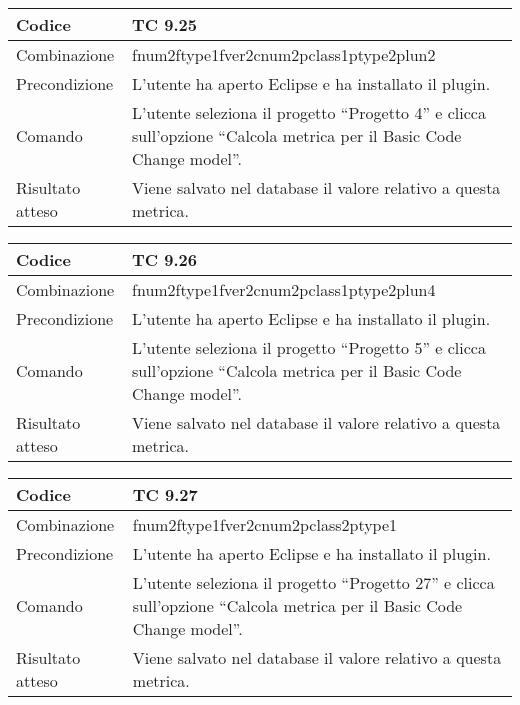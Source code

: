 \begin{table}[ht]
\begin{tabular}{|p{3cm}|p{9cm}|}
\hline
\cellcolor{lightgray}Codice				& TC 9.25								\\
\hline
\cellcolor{lightgray}Combinazione		& fnum2ftype1fver2cnum2pclass1ptype2plun2									\\
\hline
\cellcolor{lightgray}Precondizione		& L'utente ha aperto Eclipse e ha installato il plugin.		\\
\hline
\cellcolor{lightgray}Comando			& L'utente seleziona il progetto ``Progetto 4''  e clicca sull'opzione ``Calcola metrica per il Basic Code Change model''.	\\
\hline
\cellcolor{lightgray}Risultato atteso	& Viene salvato nel database il valore relativo a questa metrica.\\
\hline
\end{tabular}
\end{table}


\begin{table}[ht]
\begin{tabular}{|p{3cm}|p{9cm}|}
\hline
\cellcolor{lightgray}Codice				& TC 9.26								\\
\hline
\cellcolor{lightgray}Combinazione		& fnum2ftype1fver2cnum2pclass1ptype2plun4									\\
\hline
\cellcolor{lightgray}Precondizione		& L'utente ha aperto Eclipse e ha installato il plugin.		\\
\hline
\cellcolor{lightgray}Comando			& L'utente seleziona il progetto ``Progetto 5''  e clicca sull'opzione ``Calcola metrica per il Basic Code Change model''.	\\
\hline
\cellcolor{lightgray}Risultato atteso	& Viene salvato nel database il valore relativo a questa metrica.\\
\hline
\end{tabular}
\end{table}


\begin{table}[ht]
\begin{tabular}{|p{3cm}|p{9cm}|}
\hline
\cellcolor{lightgray}Codice				& TC 9.27								\\
\hline
\cellcolor{lightgray}Combinazione		& fnum2ftype1fver2cnum2pclass2ptype1									\\
\hline
\cellcolor{lightgray}Precondizione		& L'utente ha aperto Eclipse e ha installato il plugin.		\\
\hline
\cellcolor{lightgray}Comando			& L'utente seleziona il progetto ``Progetto 27''  e clicca sull'opzione ``Calcola metrica per il Basic Code Change model''.	\\
\hline
\cellcolor{lightgray}Risultato atteso	& Viene salvato nel database il valore relativo a questa metrica.\\
\hline
\end{tabular}
\end{table}

